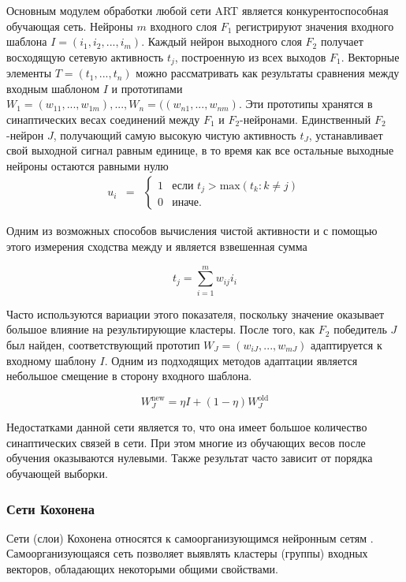 Основным модулем обработки любой сети ART является конкурентоспособная обучающая сеть. Нейроны $m$ входного слоя $F_1$ регистрируют значения входного шаблона $I = (i_1, i_2, ..., i_m)$. Каждый нейрон выходного слоя $F_2$ получает восходящую сетевую активность $t_j$, построенную из всех выходов $F_1$. Векторные элементы $T=(t_1,...,t_n)$ можно рассматривать как результаты сравнения между входным шаблоном $I$ и прототипами $W_1=(w_{11},...,w_{1m}),...,W_n=((w_{n1},...,w_{nm})$. Эти прототипы хранятся в синаптических весах соединений между $F_1$ и $F_2$-нейронами. Единственный $F_2$-нейрон $J$, получающий самую высокую чистую активность $t_J$, устанавливает свой выходной сигнал равным единице, в то время как все остальные выходные нейроны остаются равными нулю
\begin{equation}
	\begin{matrix}
		u_i & =
		& \left\{
		\begin{matrix}
			1 & \mbox{если } t_j > \text{max}(t_k : k \neq j) \\
			0 & \mbox{иначе. }
		\end{matrix} \right.
	\end{matrix}
\end{equation}

Одним из возможных способов вычисления чистой активности и с помощью этого измерения сходства между и является взвешенная сумма

\begin{equation}
	t_j = \sum_{i=1}^{m}w_{ij} i_i
\end{equation}

Часто используются вариации этого показателя, поскольку значение оказывает большое влияние на результирующие кластеры. После того, как $F_2$ победитель $J$ был найден, соответствующий прототип $W_J=(w_{iJ},...,w_{mJ})$ адаптируется к входному шаблону $I$. Одним из подходящих методов адаптации является небольшое смещение в сторону входного шаблона.

\begin{equation}
	W_J^{\text{new}}=\eta I + (1- \eta) W_J^{\text{old}}
\end{equation}

Недостатками данной сети является то, что она имеет большое количество синаптических связей в сети. При этом многие из обучающих весов после обучения оказываются нулевыми. Также результат часто зависит от порядка обучающей выборки.

\subsubsection{Сети Кохонена}
Сети (слои) Кохонена относятся к самоорганизующимся нейронным сетям \cite{gorba4enko2010seti}. Самоорганизующаяся сеть позволяет выявлять кластеры (группы) входных векторов, обладающих некоторыми общими свойствами. 

